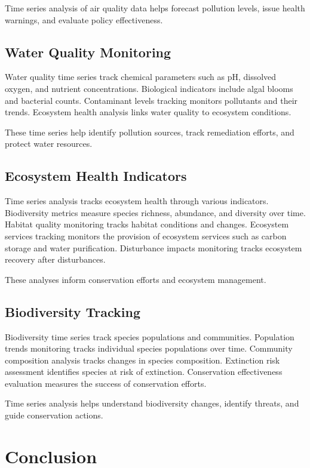 Time series analysis of air quality data helps forecast pollution levels, issue health warnings, and evaluate policy effectiveness.

\subsection{Water Quality Monitoring}

Water quality time series track chemical parameters such as pH, dissolved oxygen, and nutrient concentrations. Biological indicators include algal blooms and bacterial counts. Contaminant levels tracking monitors pollutants and their trends. Ecosystem health analysis links water quality to ecosystem conditions.

These time series help identify pollution sources, track remediation efforts, and protect water resources.

\subsection{Ecosystem Health Indicators}

Time series analysis tracks ecosystem health through various indicators. Biodiversity metrics measure species richness, abundance, and diversity over time. Habitat quality monitoring tracks habitat conditions and changes. Ecosystem services tracking monitors the provision of ecosystem services such as carbon storage and water purification. Disturbance impacts monitoring tracks ecosystem recovery after disturbances.

These analyses inform conservation efforts and ecosystem management.

\subsection{Biodiversity Tracking}

Biodiversity time series track species populations and communities. Population trends monitoring tracks individual species populations over time. Community composition analysis tracks changes in species composition. Extinction risk assessment identifies species at risk of extinction. Conservation effectiveness evaluation measures the success of conservation efforts.

Time series analysis helps understand biodiversity changes, identify threats, and guide conservation actions.

\section{Conclusion}

